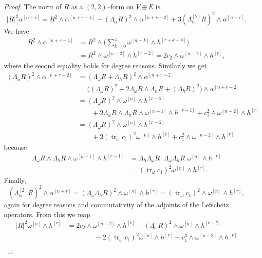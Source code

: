 \documentclass[11pt,a4paper]{amsart}
\def\^#1{^{[#1]}}
\DeclareMathOperator{\tr}{tr}
\theoremstyle{definition}
\numberwithin{equation}{section}
\begin{document}
\begin{proof}
The norm of $R$ as a $(2,2)$--form on $V \oplus E$ is
$$
|R|^2 \alpha\^{n+r}
= R^2 \wedge \alpha\^{n+r-4}
- (\Lambda_\alpha R)^2 \wedge \alpha\^{n+r-2}
+ 3 (\Lambda\^{2}_\alpha R)^2 \wedge \alpha\^{n+r}.
$$
We have
\begin{align*}
R^2 \wedge \alpha\^{n+r-4}
&= R^2 \wedge \biggl(\sum_{k=0}^4\omega\^{n-k} \wedge h\^{r+k-4}\biggr)
\\
&= R^2 \wedge \omega\^{n-2} \wedge h\^{r-2}
= 2 c_2 \wedge \omega\^{n-2} \wedge h\^{r},
\end{align*}
where the second equality holds for degree reasons. Similarly we get
\begin{align*}
(\Lambda_\alpha R)^2 \wedge \alpha\^{n+r-2}
&= (\Lambda_\omega R + \Lambda_h R)^2 \wedge \alpha\^{n+r-2}
\\
&= \bigl( (\Lambda_\omega R)^2 + 2 \Lambda_\omega R \wedge \Lambda_h R 
+ (\Lambda_h R)^2 \bigr) 
\wedge \alpha\^{n+r-2}
\\
&= (\Lambda_\omega R)^2 \wedge \omega\^{n} \wedge h\^{r-2} 
\\
&\qquad
+ 2 \Lambda_\omega R \wedge \Lambda_h R \wedge \omega\^{n-1} \wedge h\^{r-1}
+ c_1^2 \wedge \omega\^{n-2} \wedge h\^{r} 
\\
&= (\Lambda_\omega R)^2 \wedge \omega\^{n} \wedge h\^{r-2} 
\\
&\qquad
+ 2 (\tr_\omega c_1)^2 \omega\^{n} \wedge h\^{r}
+ c_1^2 \wedge \omega\^{n-2} \wedge h\^{r} 
\end{align*}
because 
\begin{align*}
\Lambda_\omega R \wedge \Lambda_h R \wedge \omega\^{n-1} \wedge h\^{r-1}
&= \Lambda_h \Lambda_\omega R \cdot \Lambda_\omega \Lambda_h R \;
\omega\^{n} \wedge h\^{r}
\\
&= (\tr_\omega c_1)^2 \omega\^{n} \wedge h\^{r}.
\end{align*}
Finally, 
$$
(\Lambda\^{2}_\alpha R)^2 \wedge \alpha\^{n+r} 
= (\Lambda_\omega \Lambda_h R)^2 \wedge \omega\^{n} \wedge h\^{r}
= (\tr_\omega c_1)^2 \wedge \omega\^{n} \wedge h\^{r},
$$
again for degree reasons and commutativity of the adjoints of the Lefschetz
operators. From this we reap
\begin{align*}
    \lvert R \rvert^2 \omega\^{n} \wedge h\^{r}
    &= 2 c_2 \wedge \omega\^{n-2} \wedge h\^{r}
    - (\Lambda_\omega R)^2 \wedge \omega\^{n} \wedge h\^{r-2} 
    \\
    &\qquad\qquad
    {}- 2 (\tr_\omega c_1)^2 \omega\^{n} \wedge h\^{r}
    - c_1^2 \wedge \omega\^{n-2} \wedge h\^{r} 
    \\

\end{align*}
\end{proof}
\end{document}
